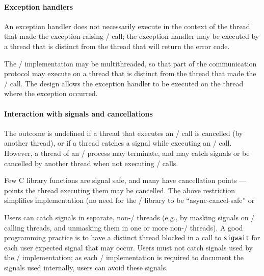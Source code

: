 \paragraph{Exception handlers}

An exception handler does not necessarily execute in the context of the
thread that made
the exception-raising \MPI/ call;  the exception handler may be
executed by a thread that is distinct from the thread that will
return the error code.

\begin{rationale}
The \MPI/ implementation may be multithreaded, so that part of the
communication protocol may execute on a thread that is distinct from
the thread that made the \MPI/ call.
The design allows the exception handler to be executed on the
thread
where the exception occurred.
\end{rationale}

\paragraph{Interaction with signals and cancellations}

The outcome is undefined if a thread that executes an \MPI/ call is
cancelled (by another thread), or if a thread catches a signal while
executing an \MPI/ call.
However, a thread of an \MPI/ process may terminate, and may catch
signals or be cancelled by another thread when not executing \MPI/ calls.

\begin{rationale}
Few C library functions are signal safe, and many have cancellation
points --- points  the thread executing them may be cancelled.  The
above restriction simplifies implementation (no need for the \MPI/
library to be ``async-cancel-safe'' or   
\end{rationale}

\begin{users}
Users can catch signals in separate, non-\MPI/ threads (e.g., by
masking signals on \MPI/ calling threads, and unmasking them in one or
more non-\MPI/ threads).  
A good programming practice is to have a distinct thread blocked
in a call to {\tt sigwait} for each user expected signal that may occur.
Users must not catch signals used by the \MPI/ implementation; as 
each \MPI/ implementation is required to document the signals used 
internally, users can avoid these signals.
\end{users}

